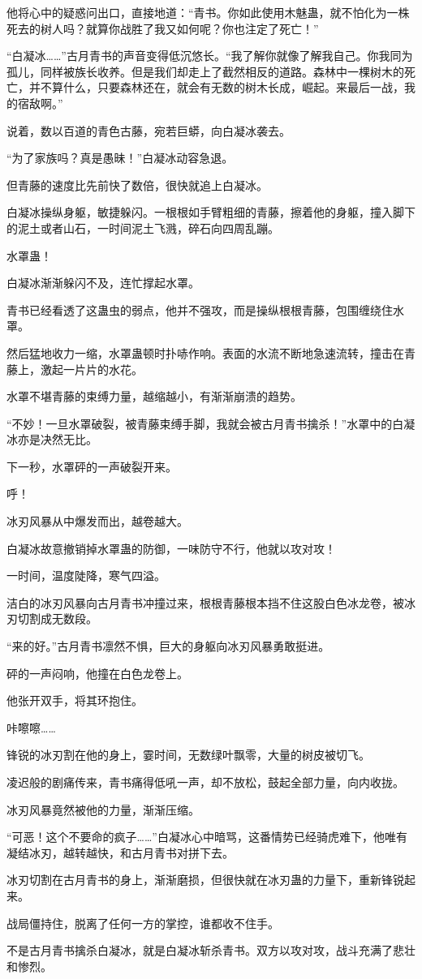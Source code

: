 \begin{this_body}
他将心中的疑惑问出口，直接地道：“青书。你如此使用木魅蛊，就不怕化为一株死去的树人吗？就算你战胜了我又如何呢？你也注定了死亡！”

“白凝冰……”古月青书的声音变得低沉悠长。“我了解你就像了解我自己。你我同为孤儿，同样被族长收养。但是我们却走上了截然相反的道路。森林中一棵树木的死亡，并不算什么，只要森林还在，就会有无数的树木长成，崛起。来最后一战，我的宿敌啊。”

说着，数以百道的青色古藤，宛若巨蟒，向白凝冰袭去。

“为了家族吗？真是愚昧！”白凝冰动容急退。

但青藤的速度比先前快了数倍，很快就追上白凝冰。

白凝冰操纵身躯，敏捷躲闪。一根根如手臂粗细的青藤，擦着他的身躯，撞入脚下的泥土或者山石，一时间泥土飞溅，碎石向四周乱蹦。

水罩蛊！

白凝冰渐渐躲闪不及，连忙撑起水罩。

青书已经看透了这蛊虫的弱点，他并不强攻，而是操纵根根青藤，包围缠绕住水罩。

然后猛地收力一缩，水罩蛊顿时扑哧作响。表面的水流不断地急速流转，撞击在青藤上，激起一片片的水花。

水罩不堪青藤的束缚力量，越缩越小，有渐渐崩溃的趋势。

“不妙！一旦水罩破裂，被青藤束缚手脚，我就会被古月青书擒杀！”水罩中的白凝冰亦是决然无比。

下一秒，水罩砰的一声破裂开来。

呼！

冰刃风暴从中爆发而出，越卷越大。

白凝冰故意撤销掉水罩蛊的防御，一味防守不行，他就以攻对攻！

一时间，温度陡降，寒气四溢。

洁白的冰刃风暴向古月青书冲撞过来，根根青藤根本挡不住这股白色冰龙卷，被冰刃切割成无数段。

“来的好。”古月青书凛然不惧，巨大的身躯向冰刃风暴勇敢挺进。

砰的一声闷响，他撞在白色龙卷上。

他张开双手，将其环抱住。

咔嚓嚓……

锋锐的冰刃割在他的身上，霎时间，无数绿叶飘零，大量的树皮被切飞。

凌迟般的剧痛传来，青书痛得低吼一声，却不放松，鼓起全部力量，向内收拢。

冰刃风暴竟然被他的力量，渐渐压缩。

“可恶！这个不要命的疯子……”白凝冰心中暗骂，这番情势已经骑虎难下，他唯有凝结冰刃，越转越快，和古月青书对拼下去。

冰刃切割在古月青书的身上，渐渐磨损，但很快就在冰刃蛊的力量下，重新锋锐起来。

战局僵持住，脱离了任何一方的掌控，谁都收不住手。

不是古月青书擒杀白凝冰，就是白凝冰斩杀青书。双方以攻对攻，战斗充满了悲壮和惨烈。

\end{this_body}

